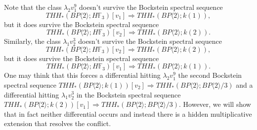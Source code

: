 Note that the class $\lambda_2v_1^9$ doesn't survive the Bockstein spectral sequence 
\[THH_*(BP\langle 2\rangle ; H\mathbb{F}_3)[v_1]\Rightarrow THH_*(BP\langle 2\rangle ; k(1)),\] 
but it does survive the Bockstein spectral sequence 
\[THH_*(BP\langle 2\rangle ; H\mathbb{F}_3)[v_2]\Rightarrow THH_*(BP\langle 2\rangle ; k(2)).\] 
Similarly, the class $\lambda_1 v_2^3$ doesn't survive the Bockstein spectral sequence 
\[THH_*(BP\langle 2\rangle ; H\mathbb{F}_3)[v_2]\Rightarrow THH_*(BP\langle 2\rangle ; k(2)),\] 
but it does survive the Bockstein spectral sequence 
\[THH_*(BP\langle 2\rangle ; H\mathbb{F}_3)[v_1]\Rightarrow THH_*(BP\langle 2\rangle ; k(1)).\] 
One may think that this forces a differential hitting $\lambda_2v_1^9$ the second Bockstein spectral sequence $THH_*(BP\langle 2\rangle ; k(1))[v_2]\Rightarrow THH_*(BP\langle 2\rangle ; BP\langle 2\rangle /3 )$ and a differential hitting $\lambda_1 v_2^3$ in the Bockstein spectral sequence $THH_*(BP\langle 2\rangle ; k(2))[v_1]\Rightarrow THH_*(BP\langle 2\rangle ;BP\langle 2\rangle/3 )$. However, we will show that in fact neither differential occurs and instead there is a hidden multiplicative extension that resolves the conflict.


